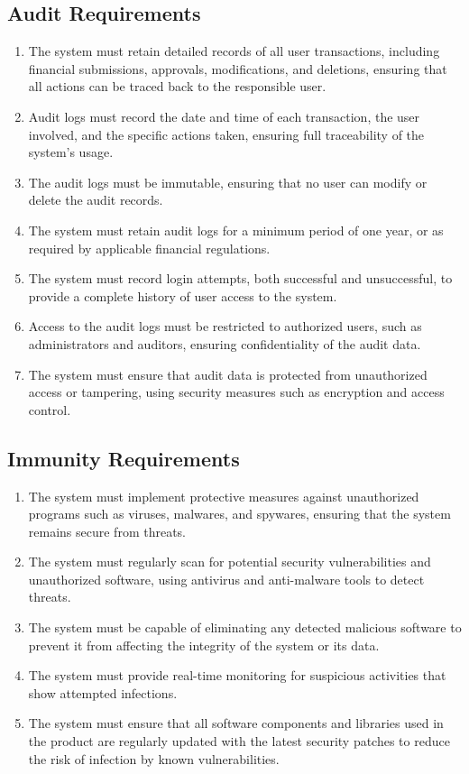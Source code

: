 \documentclass[12pt]{article}
\begin{document}
\subsection{Audit Requirements}

\begin{enumerate}
  \item The system must retain detailed records of all user transactions, including financial submissions, approvals, modifications, and deletions, ensuring that all actions can be traced back to the responsible user.
  \item Audit logs must record the date and time of each transaction, the user involved, and the specific actions taken, ensuring full traceability of the system's usage.
  \item The audit logs must be immutable, ensuring that no user can modify or delete the audit records.
  \item The system must retain audit logs for a minimum period of one year, or as required by applicable financial regulations.
  \item The system must record login attempts, both successful and unsuccessful, to provide a complete history of user access to the system.
  \item Access to the audit logs must be restricted to authorized users, such as administrators and auditors, ensuring confidentiality of the audit data.
  \item The system must ensure that audit data is protected from unauthorized access or tampering, using security measures such as encryption and access control.
\end{enumerate}

\subsection{Immunity Requirements}

\begin{enumerate}
  \item The system must implement protective measures against unauthorized programs such as viruses, malwares, and spywares, ensuring that the system remains secure from threats.
  \item The system must regularly scan for potential security vulnerabilities and unauthorized software, using antivirus and anti-malware tools to detect threats.
  \item The system must be capable of eliminating any detected malicious software to prevent it from affecting the integrity of the system or its data.
  \item The system must provide real-time monitoring for suspicious activities that show attempted infections.
  \item The system must ensure that all software components and libraries used in the product are regularly updated with the latest security patches to reduce the risk of infection by known vulnerabilities.
\end{enumerate}
\end{document}

